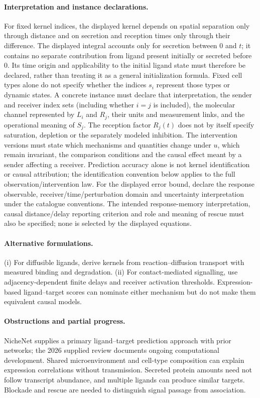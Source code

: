 \documentclass[11pt]{article}
\begin{document}
\paragraph{Interpretation and instance declarations.} For fixed kernel indices, the displayed kernel depends on spatial separation only through distance and on secretion and reception times only through their difference. The displayed integral accounts only for secretion between $0$ and $t$; it contains no separate contribution from ligand present initially or secreted before $0$. Its time origin and applicability to the initial ligand state must therefore be declared, rather than treating it as a general initialization formula. Fixed cell types alone do not specify whether the indices $s_i$ represent those types or dynamic states. A concrete instance must declare that interpretation, the sender and receiver index sets (including whether $i=j$ is included), the molecular channel represented by $L_i$ and $R_j$, their units and measurement links, and the operational meaning of $S_j$. The reception factor $R_j(t)$ does not by itself specify saturation, depletion or the separately modeled inhibition. The intervention versions must state which mechanisms and quantities change under $u$, which remain invariant, the comparison conditions and the causal effect meant by a sender affecting a receiver. Prediction accuracy alone is not kernel identification or causal attribution; the identification convention below applies to the full observation/intervention law. For the displayed error bound, declare the response observable, receiver/time/perturbation domain and uncertainty interpretation under the catalogue conventions. The intended response-memory interpretation, causal distance/delay reporting criterion and role and meaning of rescue must also be specified; none is selected by the displayed equations.

\paragraph{Alternative formulations.} (i) For diffusible ligands, derive kernels from reaction--diffusion transport with measured binding and degradation. (ii) For contact-mediated signalling, use adjacency-dependent finite delays and receiver activation thresholds. Expression-based ligand--target scores can nominate either mechanism but do not make them equivalent causal models.
\paragraph{Obstructions and partial progress.} NicheNet supplies a primary ligand--target prediction approach with prior networks; the 2026 supplied review documents ongoing computational development. Shared microenvironment and cell-type composition can explain expression correlations without transmission. Secreted protein amounts need not follow transcript abundance, and multiple ligands can produce similar targets. Blockade and rescue are needed to distinguish signal passage from association.
\end{document}
